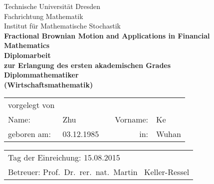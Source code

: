 \begin{titlepage}
	\begin{center}
		\Huge
		Technische Universit\"at Dresden \\[-.4em]
		Fachrichtung Mathematik \\[.5em]
		\Large
		Institut f\"ur Mathematische Stochastik \\[4em]
		\bfseries\huge
		 Fractional Brownian Motion and Applications in Financial Mathematics \\[3em]
		\normalfont\Large
		Diplomarbeit \\
		zur Erlangung des ersten akademischen Grades \\[.5em]
		\bfseries\Large
		Diplommathematiker\\[.5em]
	  	\bfseries\Large
		(Wirtschaftsmathematik)\\[4em]
	\end{center}
	\large
	\begin{tabular}{lllrl}
		vorgelegt von & & & & \\[1.2em]
		Name: & Zhu & \hspace{1.5cm} & Vorname: & Ke \\[.5em]
		geboren am: & 03.12.1985 & & in: & Wuhan \\[3em]
	\end{tabular}
	\newline
	\begin{tabular}{l}
		Tag der Einreichung: \hspace{.5cm} 15.08.2015 \\[.5em]
		Betreuer: \hspace{.5cm} Prof.~Dr.~rer.~nat.~Martin ~Keller-Ressel
	\end{tabular}
\end{titlepage}
\thispagestyle{empty}
\mbox{}
